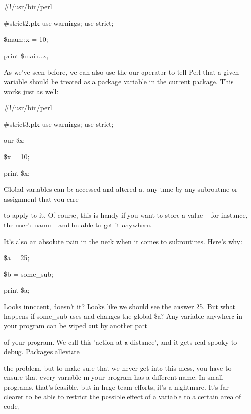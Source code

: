 \documentclass[a4paper,11pt]{book}
\begin{document}
\noindent \#!/usr/bin/perl

\noindent \#strict2.plx use warnings; use strict;

\noindent \$main::x = 10;

\noindent print \$main::x;

\noindent 

\noindent As we've seen before, we can also use the our operator to tell Perl that a given variable should be treated as a package variable in the current package. This works just as well:

\noindent 

\noindent 

\noindent \#!/usr/bin/perl

\noindent \#strict3.plx use warnings; use strict;

\noindent our \$x;

\noindent \$x = 10;

\noindent print \$x;

\noindent 

\noindent Global variables can be accessed and altered at any time by any subroutine or assignment that you care

\noindent to apply to it. Of course, this is handy if you want to store a value -- for instance, the user's name -- and be able to get it anywhere.

\noindent 

\noindent It's also an absolute pain in the neck when it comes to subroutines. Here's why:

\noindent 

\noindent 

\noindent \$a = 25;

\noindent \$b = some\_sub;

\noindent print \$a;

\noindent 

\noindent Looks innocent, doesn't it? Looks like we should see the answer 25. But what happens if some\_sub uses and changes the global \$a? Any variable anywhere in your program can be wiped out by another part

\noindent of your program. We call this 'action at a distance', and it gets real spooky to debug. Packages alleviate

\noindent the problem, but to make sure that we never get into this mess, you have to ensure that every variable in your program has a different name. In small programs, that's feasible, but in huge team efforts, it's a nightmare. It's far clearer to be able to restrict the possible effect of a variable to a certain area of code,
\end{document}
